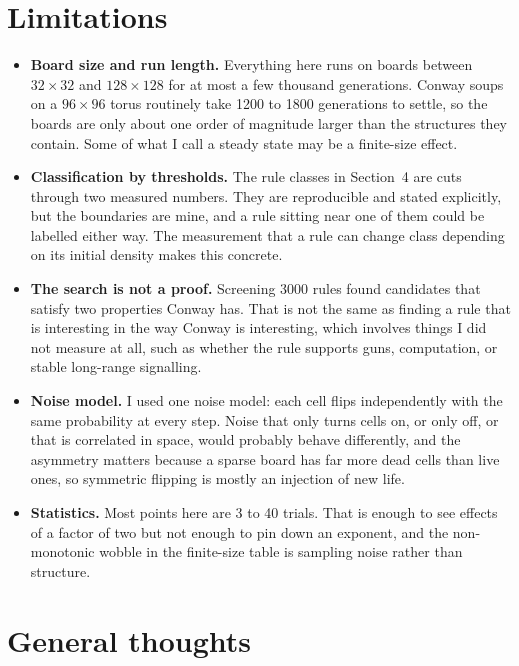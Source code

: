 \documentclass[11pt]{article}
\begin{document}
\section{Limitations}

\begin{itemize}
  \item \textbf{Board size and run length.} Everything here runs on boards between $32\times32$ and
    $128\times128$ for at most a few thousand generations. Conway soups on a $96\times96$ torus
    routinely take 1200 to 1800 generations to settle, so the boards are only about one order of
    magnitude larger than the structures they contain. Some of what I call a steady state may be a
    finite-size effect.
  \item \textbf{Classification by thresholds.} The rule classes in Section~4 are cuts through two
    measured numbers. They are reproducible and stated explicitly, but the boundaries are mine, and
    a rule sitting near one of them could be labelled either way. The measurement that a rule can
    change class depending on its initial density makes this concrete.
  \item \textbf{The search is not a proof.} Screening 3000 rules found candidates that satisfy two
    properties Conway has. That is not the same as finding a rule that is interesting in the way
    Conway is interesting, which involves things I did not measure at all, such as whether the rule
    supports guns, computation, or stable long-range signalling.
  \item \textbf{Noise model.} I used one noise model: each cell flips independently with the same
    probability at every step. Noise that only turns cells on, or only off, or that is correlated in
    space, would probably behave differently, and the asymmetry matters because a sparse board has
    far more dead cells than live ones, so symmetric flipping is mostly an injection of new life.
  \item \textbf{Statistics.} Most points here are 3 to 40 trials. That is enough to see effects of a
    factor of two but not enough to pin down an exponent, and the non-monotonic wobble in the
    finite-size table is sampling noise rather than structure.
\end{itemize}

\section{General thoughts}
\end{document}
